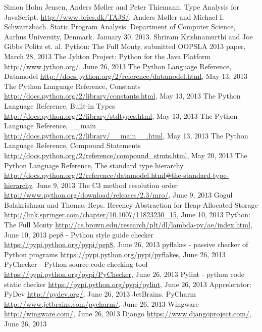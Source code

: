 \begin{thebibliography}{8}

 Simon Holm Jensen, Anders M\o ller and Peter Thiemann. Type Analysis for JavaScript. \url{http://www.brics.dk/TAJS/}.
 Anders M\o ller and Michael I. Schwartzbach. Static Program Analysis. Department of Computer Science, Aarhus University, Denmark. January 30, 2013.
 Shriram Krishnamurthi and Joe Gibbs Politz et. al. Python: The Full Monty, submitted OOPSLA 2013 paper, March 28, 2013
 The Jyhton Project: Python for the Java Platform \url{http://www.jython.org/}, June 26, 2013
 The Python Language Reference, Datamodel \url{http://docs.python.org/2/reference/datamodel.html}, May 13, 2013
 The Python Language Reference, Constants \url{http://docs.python.org/2/library/constants.html}, May 13, 2013
 The Python Language Reference, Built-in Types \url{http://docs.python.org/2/library/stdtypes.html}, May 13, 2013
 The Python Language Reference, \_\_main\_\_ \url{http://docs.python.org/2/library/__main__.html}, May 13, 2013
 The Python Language Reference, Compound Statements \url{http://docs.python.org/2/reference/compound_stmts.html}, May 20, 2013
 The Python Language Reference, The standard type hierarchy \url{http://docs.python.org/2/reference/datamodel.html#the-standard-type-hierarchy}, June 9, 2013
 The C3 method resolution order \url{http://www.python.org/download/releases/2.3/mro/}, June 9, 2013
 Gogul Balakrishnan and Thomas Reps. Recency-Abstraction for Heap-Allocated Storage \url{http://link.springer.com/chapter/10.1007/11823230_15}, June 10, 2013
 Python: The Full Monty \url{http://cs.brown.edu/research/plt/dl/lambda-py/ae/index.html}, June 10, 2013
 pep8 - Python style guide checker \url{https://pypi.python.org/pypi/pep8}, June 26, 2013
 pyflakes - passive checker of Python programs \url{https://pypi.python.org/pypi/pyflakes}, June 26, 2013
 PyChecker - Python source code checking tool \url{https://pypi.python.org/pypi/PyChecker}, June 26, 2013
 Pylint - python code static checker \url{https://pypi.python.org/pypi/pylint}, June 26, 2013
 Appcelerator: PyDev \url{http://pydev.org/}, June 26, 2013
 JetBrains. PyCharm \url{http://www.jetbrains.com/pycharm/}, June 26, 2013
 Wingware \url{http://wingware.com/}, June 26, 2013
 Django \url{https://www.djangoproject.com/}, June 26, 2013
\end{thebibliography}